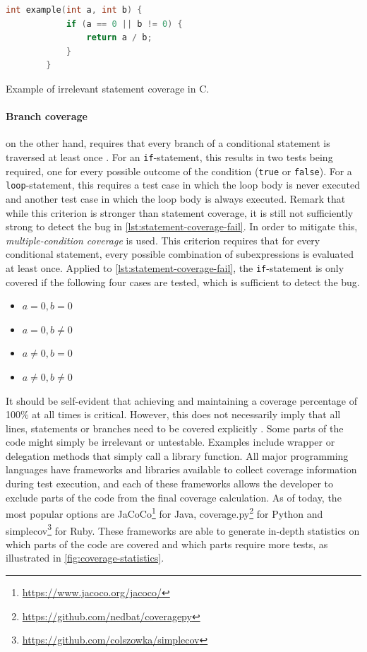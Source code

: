 \begin{listing}
	\begin{lstlisting}[language=C]
		int example(int a, int b) {
			if (a == 0 || b != 0) {
				return a / b;
			}
		}
	\end{lstlisting}
	\captionsetup{skip=-2pt}
	\caption{Example of irrelevant statement coverage in C.}
	\label{lst:statement-coverage-fail}
\end{listing}

\paragraph*{Branch coverage} on the other hand, requires that every branch of a conditional statement is traversed at least once \cite[p.~37]{Myers:2011:AST:2161638}. For an \texttt{if}-statement, this results in two tests being required, one for every possible outcome of the condition (\texttt{true} or \texttt{false}). For a \texttt{loop}-statement, this requires a test case in which the loop body is never executed and another test case in which the loop body is always executed. Remark that while this criterion is stronger than statement coverage, it is still not sufficiently strong to detect the bug in \autoref{lst:statement-coverage-fail}. In order to mitigate this, \emph{multiple-condition coverage} \cite[p.~40]{Myers:2011:AST:2161638} is used. This criterion requires that for every conditional statement, every possible combination of subexpressions is evaluated at least once. Applied to \autoref{lst:statement-coverage-fail}, the \texttt{if}-statement is only covered if the following four cases are tested, which is sufficient to detect the bug.
\begin{itemize}
	\item $a = 0, b = 0$
	\item $a = 0, b \neq 0$
	\item $a \neq 0, b = 0$
	\item $a \neq 0, b \neq 0$
\end{itemize}

\noindent It should be self-evident that achieving and maintaining a coverage percentage of 100\% at all times is critical. However, this does not necessarily imply that all lines, statements or branches need to be covered explicitly \cite{dein_2019}. Some parts of the code might simply be irrelevant or untestable. Examples include wrapper or delegation methods that simply call a library function. All major programming languages have frameworks and libraries available to collect coverage information during test execution, and each of these frameworks allows the developer to exclude parts of the code from the final coverage calculation. As of today, the most popular options are JaCoCo\footnote{\url{https://www.jacoco.org/jacoco/}} for Java, coverage.py\footnote{\url{https://github.com/nedbat/coveragepy}} for Python and simplecov\footnote{\url{https://github.com/colszowka/simplecov}} for Ruby. These frameworks are able to generate in-depth statistics on which parts of the code are covered and which parts require more tests, as illustrated in \autoref{fig:coverage-statistics}.

